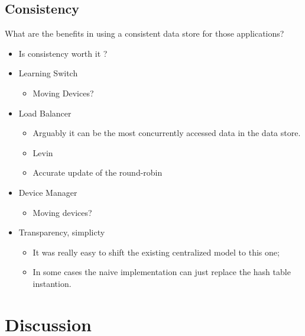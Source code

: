 \subsection{Consistency} 
What are the benefits in using a consistent data store for those applications? 
\begin{itemize}
\item Is consistency worth it ? 
\item Learning Switch   
  \begin{itemize}
  \item Moving Devices?
  \end{itemize}
\item Load Balancer
  \begin{itemize}
  \item Arguably it can be  the most concurrently accessed data in the data store.  
  \item Levin 
  \item Accurate update of the round-robin
  \end{itemize}
\item Device Manager
  \begin{itemize}
  \item Moving devices?
  \end{itemize}
\item Transparency, simplicty
  \begin{itemize}
  \item It was really easy to shift the existing centralized model to this one; 
  \item In some cases the naive implementation can just replace the hash table instantion. 
  \end{itemize}
\end{itemize}




\section{Discussion}


